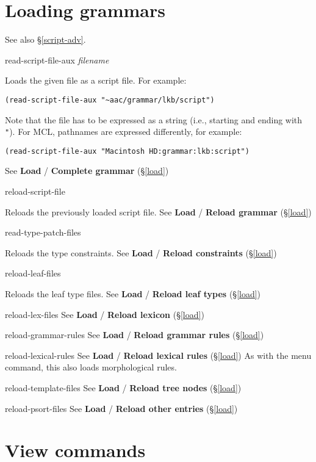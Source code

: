 \documentclass[12pt]{report}
\newcommand{\lispcommand}[1]{\noindent\rm #1}%
\newcommand{\lkbmenucommand}{\bf}
\begin{document}
\section{Loading grammars}

See also \S\ref{script-adv}.

\lispcommand{read-script-file-aux {\it filename}}

Loads the given file as a script file.
For example: 
\begin{verbatim}
(read-script-file-aux "~aac/grammar/lkb/script")
\end{verbatim}
Note that the file has to be expressed as a string
(i.e., starting and ending with {\tt "}).
For MCL, pathnames are expressed differently, for example:
\begin{verbatim}
(read-script-file-aux "Macintosh HD:grammar:lkb:script")
\end{verbatim}
See {\lkbmenucommand Load} / {\lkbmenucommand Complete grammar} (\S\ref{load})

\lispcommand{reload-script-file}

Reloads the previously loaded script file.
See {\lkbmenucommand Load} / {\lkbmenucommand Reload grammar} (\S\ref{load})

\lispcommand{read-type-patch-files}

Reloads the type constraints.
See {\lkbmenucommand Load} / {\lkbmenucommand Reload constraints} (\S\ref{load})

\lispcommand{reload-leaf-files}

Reloads the leaf type files.
See {\lkbmenucommand Load} / {\lkbmenucommand Reload leaf types} (\S\ref{load})

\lispcommand{reload-lex-files}
See {\lkbmenucommand Load} / {\lkbmenucommand Reload lexicon} (\S\ref{load})

\lispcommand{reload-grammar-rules}
See {\lkbmenucommand Load} / {\lkbmenucommand Reload grammar rules} (\S\ref{load})

\lispcommand{reload-lexical-rules}
See {\lkbmenucommand Load} / {\lkbmenucommand Reload lexical rules} (\S\ref{load})
As with the menu command, this also loads morphological rules.

\lispcommand{reload-template-files}
See {\lkbmenucommand Load} / {\lkbmenucommand Reload tree nodes} (\S\ref{load})

\lispcommand{reload-psort-files}
See {\lkbmenucommand Load} / {\lkbmenucommand Reload other entries} (\S\ref{load})


\section{View commands}
\end{document}
